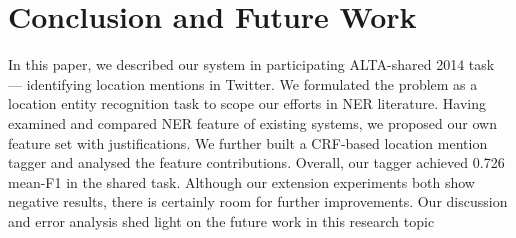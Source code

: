 \documentclass[11pt]{article}
\begin{document}
\section{Conclusion and Future Work}
\label{sec:conclusion}
In this paper, we described our system in participating ALTA-shared 2014 task --- identifying location mentions in Twitter.
We formulated the problem as a location entity recognition task to scope our efforts in NER literature.
Having examined and compared NER feature of existing systems, we proposed our own feature set with justifications.
We further built a CRF-based location mention tagger and analysed the feature contributions.
Overall, our tagger achieved 0.726 mean-F1 in the shared task.
Although our extension experiments both show negative results, there is certainly room for further improvements.
Our discussion and error analysis shed light on the future work in this research topic



\end{document}
